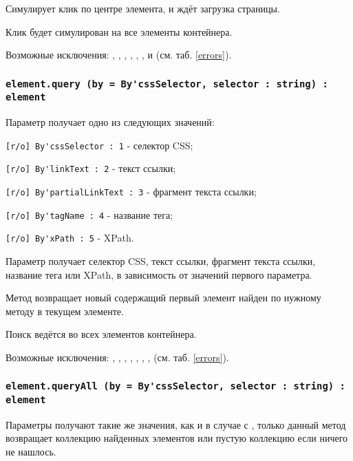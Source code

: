 Симулирует клик по центре элемента, и ждёт загрузка страницы.

\code{[icL]} Клик будет симулирован на все элементы контейнера.

Возможные исключения: , , , , , ,  и  (см. таб. \ref{errors}).

\subsubsection{\lstinline|element.query (by = By'cssSelector, selector : string) : element|}

Параметр  получает одно из следующих значений:
\begin{icItems}
	\item \lstinline|[r/o] By'cssSelector : 1| - селектор CSS;
	\item \lstinline|[r/o] By'linkText : 2| - текст ссылки;
	\item \lstinline|[r/o] By'partialLinkText : 3| - фрагмент текста ссылки;
	\item \lstinline|[r/o] By'tagName : 4| - название тега;
	\item \lstinline|[r/o] By'xPath : 5| - XPath.
\end{icItems}

Параметр  получает селектор CSS, текст ссылки, фрагмент текста ссылки, название тега или XPath, в зависимость от значений первого параметра.

Метод возвращает новый \element{} содержащий первый элемент найден по нужному методу в текущем элементе.

\code{[icL]} Поиск ведётся во всех элементов контейнера.

Возможные исключения: , , , , , , ,  (см. таб. \ref{errors}).

\subsubsection{\lstinline|element.queryAll (by = By'cssSelector, selector : string) : element|}

Параметры получают такие же значения, как и в случае с , только данный метод возвращает коллекцию найденных элементов или пустую коллекцию если ничего не нашлось.

